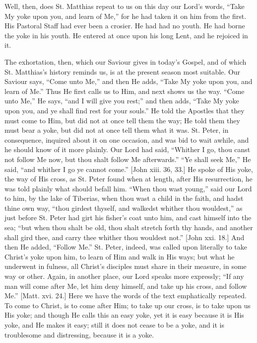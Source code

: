 Well, then, does St. Matthias repeat to us on this day our Lord's
words, ``Take My yoke upon you, and learn of Me,'' for he had
taken it on him from the first. His Pastoral Staff had ever been a
crosier. He had had no youth. He had borne the yoke in his youth. He
entered at once upon his long Lent, and he rejoiced in it.

The exhortation, then, which our Saviour gives in today's Gospel,
and of which St. Matthias's history reminds us, is at the present
season most suitable. Our Saviour says, ``Come unto Me,'' and
then He adds, ``Take My yoke upon you, and learn of Me.'' Thus
He first calls us to Him, and next shows us the way. ``Come unto
Me,'' He says, ``and I will give you rest;'' and then
adds, ``Take My yoke upon you, and ye shall find rest for your
souls.'' He told the Apostles that they must come to Him, but did
not at once tell them the way; He told them they must bear a yoke, but
did not at once tell them what it was. St. Peter, in consequence,
inquired about it on one occasion, and was bid to wait awhile, and he
should know of it more plainly. Our Lord had said, ``Whither I go,
thou canst not follow Me now, but thou shalt follow Me
afterwards.'' ``Ye shall seek Me,'' He said, ``and
whither I go ye cannot come.'' [John xiii. 36, 33.] He spoke of
His yoke, the way of His cross, as St. Peter found when at length,
after His resurrection, he was told plainly what should befall him.
``When thou wast young,'' said our Lord to him, by the lake of
Tiberias, when thou wast a child in the faith, and hadst thine own
way, ``thou girdest thyself, and walkedst whither thou wouldest,''
as just before St. Peter had girt his fisher's coat unto him, and cast
himself into the sea; ``but when thou shalt be old, thou shalt
stretch forth thy hands, and another shall gird thee, and carry thee
whither thou wouldest not.'' [John xxi. 18.] And then He added,
``Follow Me.'' St. Peter, indeed, was called upon literally to
take Christ's yoke upon him, to learn of Him and walk in His ways; but
what he underwent in fulness, all Christ's disciples must share in
their measure, in some way or other. Again, in another place, our Lord
speaks more expressly; ``If any man will come after Me, let him
deny himself, and take up his cross, and follow Me.'' [Matt. xvi.
24.] Here we have the words of the text emphatically repeated. To come
to Christ, is to come after Him; to take up our cross, is to take upon
us His yoke; and though He calls this an easy yoke, yet it is easy
because it is His yoke, and He makes it easy; still it does not cease
to be a yoke, and it is troublesome and distressing, because it is a
yoke.

